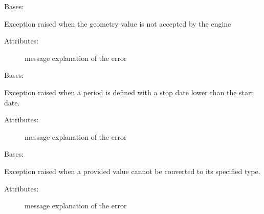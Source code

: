 
\begin{fulllineitems}
\label{\detokenize{gsdm.engine:gsdm.engine.errors.WrongGeometry}}
Bases: {\hyperref[\detokenize{gsdm.engine:gsdm.engine.errors.Error}]{}}

Exception raised when the geometry value is not accepted by the engine
\begin{description}
\item[{Attributes:}] \leavevmode
message \textendash{} explanation of the error

\end{description}

\end{fulllineitems}


\begin{fulllineitems}
\label{\detokenize{gsdm.engine:gsdm.engine.errors.WrongPeriod}}
Bases: {\hyperref[\detokenize{gsdm.engine:gsdm.engine.errors.Error}]{}}

Exception raised when a period is defined with a stop date lower than the start date.
\begin{description}
\item[{Attributes:}] \leavevmode
message \textendash{} explanation of the error

\end{description}

\end{fulllineitems}


\begin{fulllineitems}
\label{\detokenize{gsdm.engine:gsdm.engine.errors.WrongValue}}
Bases: {\hyperref[\detokenize{gsdm.engine:gsdm.engine.errors.Error}]{}}

Exception raised when a provided value cannot be converted to its specified type.
\begin{description}
\item[{Attributes:}] \leavevmode
message \textendash{} explanation of the error

\end{description}

\end{fulllineitems}



